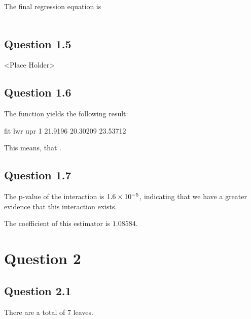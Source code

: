 \documentclass[parskip=full]{scrartcl}
\begin{document}
    The final regression equation is \\
    \\

    \subsection*{Question 1.5}

    <Place Holder>

    \subsection*{Question 1.6}


    The  function yields the following result:
    
    \begin{lcverbatim}
      fit      lwr      upr
1 21.9196 20.30209 23.53712
    \end{lcverbatim}
    
    This means, that .

    \subsection*{Question 1.7}

    The p-value of the interaction is $1.6\times 10^{-5}$, indicating that we have a greater evidence that this interaction exists.

    The coefficient of this estimator is $1.08584$.

\section*{Question 2}
    \subsection*{Question 2.1}

    There are a total of 7 leaves.
\end{document}

